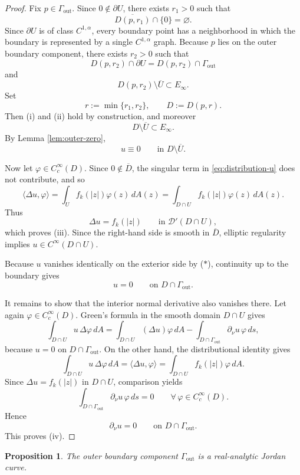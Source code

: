 \documentclass[11pt]{amsart}
\newtheorem{proposition}[theorem]{Proposition}
\theoremstyle{remark}
\newcommand{\D}{\mathcal D}
\newcommand{\1}{\mathbf 1}
\begin{document}
\begin{proof}
Fix $p\in \Gamma_{\mathrm{out}}$. Since $0\notin \partial U$, there exists $r_1>0$ such that
\[
\overline{D(p,r_1)}\cap \{0\}=\varnothing.
\]
Since $\partial U$ is of class $C^{1,\alpha}$, every boundary point has a neighborhood in which the boundary is represented by a single $C^{1,\alpha}$ graph. Because $p$ lies on the outer boundary component, there exists $r_2>0$ such that
\[
D(p,r_2)\cap \partial U = D(p,r_2)\cap \Gamma_{\mathrm{out}}
\]
and
\[
D(p,r_2)\setminus \overline U \subset E_\infty.
\]
Set
\[
r:=\min\{r_1,r_2\},
\qquad
D:=D(p,r).
\]
Then (i) and (ii) hold by construction, and moreover
\[
D\setminus \overline U \subset E_\infty.
\]
By Lemma \ref{lem:outer-zero},
\[
u\equiv 0
\qquad\text{in }D\setminus \overline U.
\tag{$*$}
\]

Now let $\varphi\in C_c^\infty(D)$. Since $0\notin \overline D$, the singular term in \eqref{eq:distribution-u} does not contribute, and so
\[
\langle \Delta u,\varphi\rangle
=
\int_U f_k(|z|)\varphi(z)\,dA(z)
=
\int_{D\cap U} f_k(|z|)\varphi(z)\,dA(z).
\]
Thus
\[
\Delta u = f_k(|z|)
\qquad\text{in }\D'(D\cap U),
\]
which proves (iii). Since the right-hand side is smooth in $\overline D$, elliptic regularity implies $u\in C^\infty(D\cap U)$.

Because $u$ vanishes identically on the exterior side by ($*$), continuity up to the boundary gives
\[
u=0
\qquad\text{on }D\cap \Gamma_{\mathrm{out}}.
\]

It remains to show that the interior normal derivative also vanishes there. Let again $\varphi\in C_c^\infty(D)$. Green's formula in the smooth domain $D\cap U$ gives
\[
\int_{D\cap U} u\,\Delta\varphi\,dA
=
\int_{D\cap U} (\Delta u)\varphi\,dA
-
\int_{D\cap \Gamma_{\mathrm{out}}} \partial_\nu u\, \varphi\, ds,
\]
because $u=0$ on $D\cap \Gamma_{\mathrm{out}}$. On the other hand, the distributional identity gives
\[
\int_{D\cap U} u\,\Delta\varphi\,dA
=
\langle \Delta u,\varphi\rangle
=
\int_{D\cap U} f_k(|z|)\varphi\,dA.
\]
Since $\Delta u=f_k(|z|)$ in $D\cap U$, comparison yields
\[
\int_{D\cap \Gamma_{\mathrm{out}}} \partial_\nu u\, \varphi\, ds = 0
\qquad\forall\,\varphi\in C_c^\infty(D).
\]
Hence
\[
\partial_\nu u=0
\qquad\text{on }D\cap \Gamma_{\mathrm{out}}.
\]
This proves (iv).
\end{proof}

\begin{proposition}\label{prop:outer-analytic}
The outer boundary component $\Gamma_{\mathrm{out}}$ is a real-analytic Jordan curve.
\end{proposition}
\end{document}
